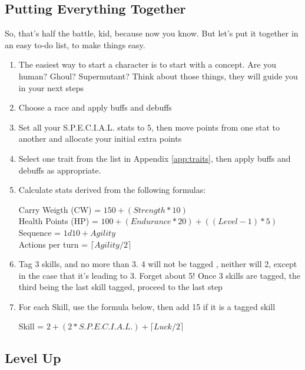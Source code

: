\documentclass[11pt]{article} %
\begin{document}
\subsection{Putting Everything Together}

So, that's half the battle, kid, because now you know. But let's put it together in an easy to-do list, to make things easy.

\begin{enumerate}
	\item The easiest way to start a character is to start with a concept. Are you human? Ghoul? Supermutant? Think about those things, they will guide you in your next steps
	\item Choose a race and apply buffs and debuffs
	\item Set all your S.P.E.C.I.A.L. stats to 5, then move points from one stat to another and allocate your initial extra points
	\item Select one trait from the list in Appendix \ref{app:traits}, then apply buffs and debuffs as appropriate. 
	\item Calculate stats derived from the following formulas:
	
		\begin{center}
			Carry Weigth (CW) = $150 + (Strength * 10)$ \\
			Health Points (HP) = $100 + (Endurance * 20) + ((Level - 1) * 5)$ \\
			Sequence = $1d10 + Agility$ \\
			Actions per turn = $ \lceil Agility / 2 \rceil $
		\end{center}
	
	\item Tag 3 skills, and no more than 3. 4 will not be tagged , neither will 2, except in the case that it's leading to 3. Forget about 5! Once 3 skills are tagged, the third being the last skill tagged, proceed to the last step
	\item For each Skill, use the formula below, then add 15 if it is a tagged skill

		\begin{center}
			Skill = $2 + (2 * S.P.E.C.I.A.L.) + \lceil Luck / 2 \rceil$
		\end{center}
\end{enumerate}

\subsection{Level Up} 
\end{document}
